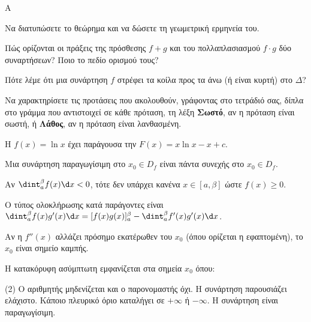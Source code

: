 \begin{thema}{A}
\begin{erwthma}
    \item Να διατυπώσετε το θεώρημα  και να δώσετε τη γεωμετρική ερμηνεία του.
    \item Πώς ορίζονται οι πράξεις της πρόσθεσης $f+g$ και του πολλαπλασιασμού $f \cdot g$ δύο συναρτήσεων? Ποιο το πεδίο ορισμού τους?
    \item Πότε λέμε ότι μια συνάρτηση $f$ στρέφει τα κοίλα προς τα άνω (ή είναι κυρτή) στο $\Delta$?
    \item Να χαρακτηρίσετε τις προτάσεις που ακολουθούν, γράφοντας στο τετράδιό σας, δίπλα στο γράμμα που αντιστοιχεί σε κάθε πρόταση, τη λέξη \textbf{Σωστό}, αν η πρόταση είναι σωστή, ή \textbf{Λάθος}, αν η πρόταση είναι λανθασμένη.
    \begin{alist}
        \item Η $f(x) = \ln x$ έχει παράγουσα την $F(x) = x\ln x - x + c$.
        \item Μια συνάρτηση παραγωγίσιμη στο $x_0\in D_f$ είναι πάντα συνεχής στο $x_0\in D_f$.
        \item Αν $\dint_a^\beta f(x) \d x < 0$, τότε δεν υπάρχει κανένα $x\in[a, \beta]$ ώστε $f(x)\ge 0$.
        \item Ο τύπος ολοκλήρωσης κατά παράγοντες είναι $\dint_a^\beta f(x)g'(x) \d x = [f(x)g(x)]_a^\beta - \dint_a^\beta f'(x)g'(x) \d x$.
        \item Αν η $f''(x)$ αλλάζει πρόσημο εκατέρωθεν του $x_0$ (όπου ορίζεται η εφαπτομένη), το $x_0$ είναι σημείο καμπής.
    \end{alist}
    \item Η κατακόρυφη ασύμπτωτη εμφανίζεται στα σημεία $x_0$ όπου:
    \begin{tasks}[label=\let\textdexiakeraia\relax\alph*.](2)
        \task Ο αριθμητής μηδενίζεται και ο παρονομαστής όχι.
        \task Η συνάρτηση παρουσιάζει ελάχιστο.
        \task Κάποιο πλευρικό όριο καταλήγει σε $+\infty$ ή $-\infty$.
        \task Η συνάρτηση είναι παραγωγίσιμη.
    \end{tasks}
\end{erwthma}
\end{thema}


